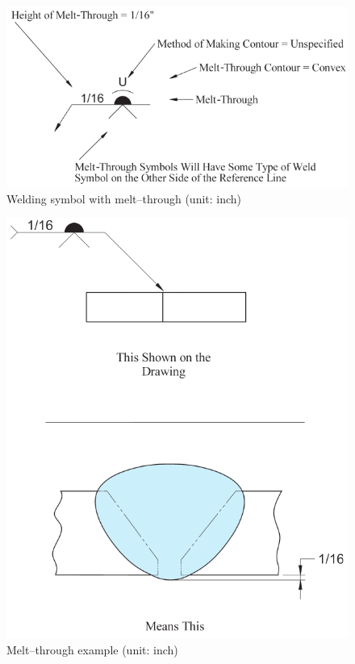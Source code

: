 \begin{figure}[H]
\centering
\includegraphics{PIC/CH07/EXAMPLE/MT}
\caption{Welding symbol with melt--through (unit: inch) \citep{Corgan2017}}
\end{figure}
\begin{figure}[H]
\centering
\includegraphics{PIC/CH07/EXAMPLE/MT2}
\caption{Melt--through example (unit: inch) \citep{Corgan2017}}
\end{figure}
